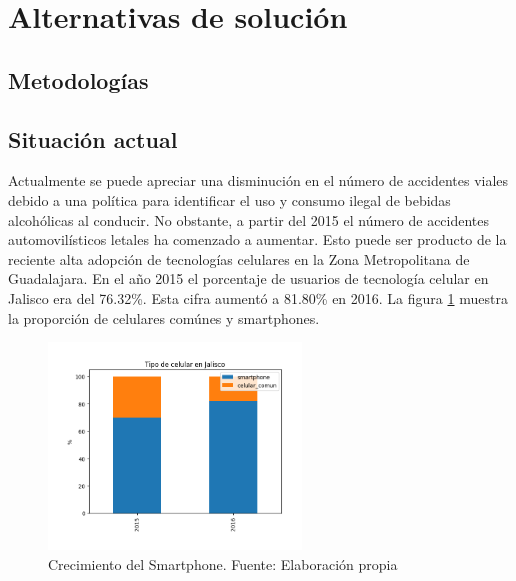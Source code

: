 \documentclass{article}
\begin{document}
\newpage

\section{Alternativas de solución}\label{sec:alternatives}

% 

\subsection{Metodologías}

\subsection{Situación actual}\label{subsec:actual}

Actualmente se puede apreciar una disminución en el número de accidentes viales debido a
una política para identificar el uso y consumo ilegal de bebidas alcohólicas al conducir.
No obstante, a partir del 2015 el número de accidentes automovilísticos letales ha comenzado
a aumentar. Esto puede ser producto de la reciente alta adopción de tecnologías celulares en la Zona
Metropolitana de Guadalajara. En el año 2015 el porcentaje de usuarios de tecnología celular en Jalisco
era del 76.32\%. Esta cifra aumentó a 81.80\% en 2016. La figura \ref{fig:tipo_celular} muestra la
proporción de celulares comúnes y smartphones.


	\begin{figure}[H]\centering
	\includegraphics[width=0.6\textwidth]{resources/img/tipo_de_celular.png}
	\caption{\label{fig:tipo_celular} Crecimiento del Smartphone. Fuente: Elaboración propia}
    \end{figure}
\end{document}
